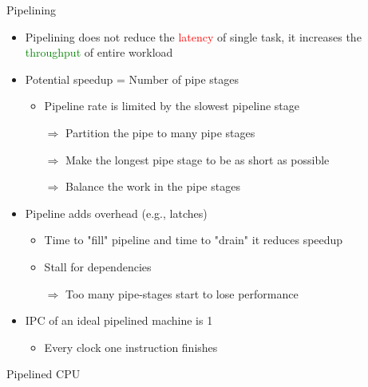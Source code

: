 \documentclass[aspectratio=169,12pt]{beamer}
\begin{document}
\begin{frame}{Pipelining}
    \begin{itemize}
        \item Pipelining does not reduce the \textcolor{red}{latency} of single task, it increases the \textcolor{green}{throughput} of entire workload
        \item Potential speedup = Number of pipe stages
        \begin{itemize}
            \item Pipeline rate is limited by the slowest pipeline stage
            \item[$\Rightarrow$] Partition the pipe to many pipe stages
            \item[$\Rightarrow$] Make the longest pipe stage to be as short as possible
            \item[$\Rightarrow$] Balance the work in the pipe stages
        \end{itemize}
        \item Pipeline adds overhead (e.g., latches)
        \begin{itemize}
            \item Time to "fill" pipeline and time to "drain" it reduces speedup
            \item Stall for dependencies
            \item[$\Rightarrow$] Too many pipe-stages start to lose performance
        \end{itemize}
        \item IPC of an ideal pipelined machine is 1
        \begin{itemize}
            \item Every clock one instruction finishes
        \end{itemize}
    \end{itemize}
\end{frame}

\begin{frame}{Pipelined CPU}
    \centering
\end{frame}
\end{document}
